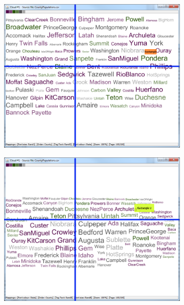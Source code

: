 \begin{figure}[!htb]
\begin{subfigure}{.5\textwidth}
  \includegraphics[scale=0.25]{Experiment1/Trial3/C2S1L2.png}
\end{subfigure}%
\begin{subfigure}{.5\textwidth}
  \centering
 \includegraphics[scale=0.25]{Experiment1/Trial3/C2S1L1.png}
\end{subfigure}
\begin{subfigure}{.5\textwidth}
  \centering

\end{subfigure}
\end{figure}
